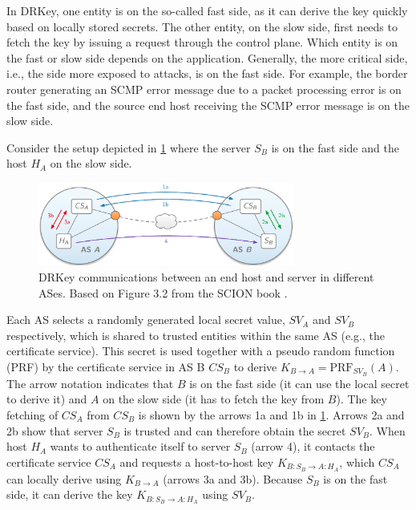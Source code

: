 In DRKey, one entity is on the so-called fast side, as it can derive the key quickly based on locally stored secrets.
The other entity, on the slow side, first needs to fetch the key by issuing a request through the control plane.
Which entity is on the fast or slow side depends on the application.
Generally, the more critical side, i.e., the side more exposed to attacks, is on the fast side.
For example, the border router generating an SCMP error message due to a packet processing error is on the fast side, and the source end host receiving the SCMP error message is on the slow side.

Consider the setup depicted in \cref{fig:drkey_setup} where the server $S_B$ is on the fast side and the host $H_A$ on the slow side.
\begin{figure}[h]
    \centering
    \includegraphics[width=0.75\textwidth]{figures/drkey_topo.png}
    \caption{DRKey communications between an end host and server in different ASes. Based on Figure 3.2 from the SCION book \cite{Perrig2022}.}
    \label{fig:drkey_setup}
\end{figure}

Each AS selects a randomly generated local secret value, $SV_A$ and $SV_B$ respectively, which is shared to trusted entities within the same AS (e.g., the certificate service).
This secret is used together with a pseudo random function (PRF) by the certificate service in AS B $CS_B$ to derive $K_{B \rightarrow A} = \text{PRF}_{SV_B}(A)$.
The arrow notation indicates that $B$ is on the fast side (it can use the local secret to derive it) and $A$ on the slow side (it has to fetch the key from $B$).
The key fetching of $CS_A$ from $CS_B$ is shown by the arrows 1a and 1b in \cref{fig:drkey_setup}.
Arrows 2a and 2b show that server $S_B$ is trusted and can therefore obtain the secret $SV_B$.
When host $H_A$ wants to authenticate itself to server $S_B$ (arrow 4), it contacts the certificate service $CS_A$ and requests a host-to-host key $K_{B:S_B \rightarrow A:H_A}$, which $CS_A$ can locally derive using $K_{B \rightarrow A}$ (arrows 3a and 3b).
Because $S_B$ is on the fast side, it can derive the key $K_{B:S_B \rightarrow A:H_A}$ using $SV_B$.

